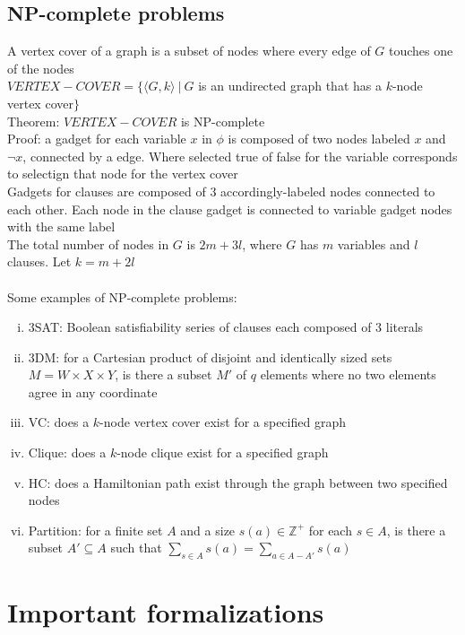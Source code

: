 \documentclass{article}
\newcommand*{\<}{\langle}
\renewcommand*{\>}{\rangle}
\begin{document}
		\subsection{NP-complete problems}
			A vertex cover of a graph is a subset of nodes where every edge of $G$ touches one of the nodes \\
			$VERTEX-COVER = \{\<G, k\>\:|\:G$ is an undirected graph that has a $k$-node vertex cover$\}$ \\
			Theorem: $VERTEX-COVER$ is NP-complete \\
			Proof: a gadget for each variable $x$ in $\phi$ is composed of two nodes labeled $x$ and $\neg x$, connected by a edge. Where selected true of false for the variable corresponds to selectign that node for the vertex cover \\
			Gadgets for clauses are composed of 3 accordingly-labeled nodes connected to each other. Each node in the clause gadget is connected to variable gadget nodes with the same label \\
			The total number of nodes in $G$ is $2m + 3l$, where $G$ has $m$ variables and $l$ clauses. Let $k = m + 2l$ \\
			\\
			Some examples of NP-complete problems:
			\begin{enumerate}[(i)]
				\item 3SAT: Boolean satisfiability series of clauses each composed of 3 literals
				\item 3DM: for a Cartesian product of disjoint and identically sized sets $M = W \times X \times Y$, is there a subset $M'$ of $q$ elements where no two elements agree in any coordinate
				\item VC: does a $k$-node vertex cover exist for a specified graph
				\item Clique: does a $k$-node clique exist for a specified graph
				\item HC: does a Hamiltonian path exist through the graph between two specified nodes
				\item Partition: for a finite set $A$ and a size $s(a) \in \mathbb{Z}^+$ for each $s \in A$, is there a subset $A' \subseteq A$ such that $\sum_{s \in A} s(a) = \sum_{a \in A - A'} s(a)$
				\end{enumerate}
		\clearpage

	\appendix

	\section{Important formalizations}
\end{document}
